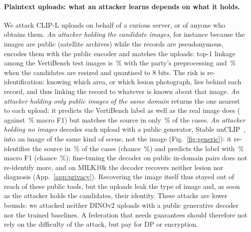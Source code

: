 \paragraph{Plaintext uploads: what an attacker learns depends on what it holds.}
We attack CLIP-L uploads on behalf of a curious server, or of anyone who obtains them. \emph{An attacker holding the candidate images}, for instance because the images are public (satellite archives) while the records are pseudonymous, encodes them with the public encoder and matches the uploads: top-1 linkage among the \lkN{} VertiBench test images is \lkSame\,\% with the party's preprocessing and \lkEightbit\,\% when the candidates are resized and quantised to 8 bits. The risk is re-identification: knowing which area, or which lesion photograph, lies behind each record, and thus linking the record to whatever is known about that image. \emph{An attacker holding only public images of the same domain} returns the one nearest to each upload: it predicts the VertiBench label as well as the real image does (\giVbNnLabFone{} against \giVbRealFone\,\% macro F1) but matches the source in only \giVbNnReid\,\% of the cases. \emph{An attacker holding no images} decodes each upload with a public generator, Stable unCLIP~\cite{ramesh2022unclip,rombach2022ldm}, into an image of the same kind of scene, not the image (Fig.~\ref{fig:generic}): it re-identifies the source in \giVbReid\,\% of the cases (chance \giVbChance\,\%) and predicts the label with \giVbLabFone\,\% macro F1 (chance \giVbChanceFone\,\%); fine-tuning the decoder on public in-domain pairs does not re-identify more, and on MILK10k the decoder recovers neither lesion nor diagnosis (App.~\ref{app:privacy}). Recovering the image itself thus stayed out of reach of these public tools, but the uploads leak the type of image and, as soon as the attacker holds the candidates, their identity. These attacks are lower bounds: we attacked neither DINOv2 uploads with a public generative decoder nor the trained baselines. A federation that needs guarantees should therefore not rely on the difficulty of the attack, but pay for DP or encryption.

